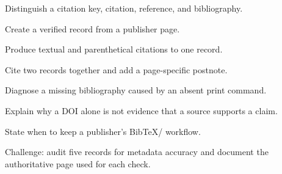 \chapterexercisestitle
\begin{chapterexercises}
  \item Distinguish a citation key, citation, reference, and bibliography.
  \item Create a verified  record from a publisher page.
  \item Produce textual and parenthetical citations to one record.
  \item Cite two records together and add a page-specific postnote.
  \item Diagnose a missing bibliography caused by an absent print command.
  \item Explain why a DOI alone is not evidence that a source supports a claim.
  \item State when to keep a publisher's BibTeX/ workflow.
  \item Challenge: audit five records for metadata accuracy and document the
        authoritative page used for each check.
\end{chapterexercises}
